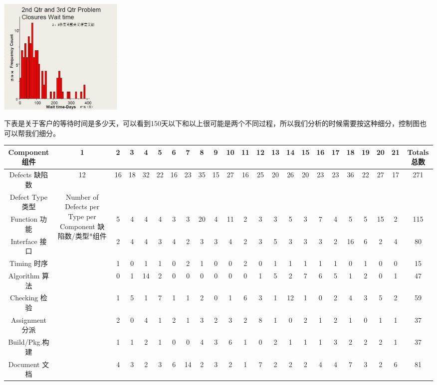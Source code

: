 
\includegraphics[width=6cm]{微信截图_20231026160044.png}

下表是关于客户的等待时间是多少天，可以看到150天以下和以上很可能是两个不同过程，所以我们分析的时候需要按这种细分，控制图也可以帮我们细分。



\begin{tabular}{|c|c|c|c|c|c|c|c|c|c|c|c|c|c|c|c|c|c|c|c|c|c|c|}
\hline
Component 组件&1&2&3&4&5&6&7&8&9&10&11&12&13&14&15&16&17&18&19&20&21&Totals 总数\\
\hline
Defects 缺陷数&12&16&18&32&22&16&23&35&15&27&16&25&20&26&20&23&23&36&22&27&17&271\\
\hline
Defect Type 类型&\multirow{21}{*}{Number of Defects per Type per Component 缺陷数/类型*组件}&\:\\
\hline
Function 功能&3&5&4&4&4&3&3&20&4&11&2&3&3&5&3&7&4&5&5&15&2&115\\
\hline
Interface 接口&2&2&4&4&3&4&2&3&3&4&2&3&5&3&3&3&2&16&6&2&4&80\\
\hline
Timing 时序&1&1&0&1&1&0&2&1&0&0&2&0&1&1&1&1&1&0&1&0&0&15\\
\hline
Algorithm 算法&0&0&1&14&2&0&0&0&0&0&0&1&5&2&7&6&5&1&2&0&1&47\\
\hline
Checking 检验&1&1&5&1&7&1&1&2&0&1&6&3&1&12&1&0&2&4&3&5&2&59\\
\hline
Assignment 分派&0&2&0&4&1&2&1&3&2&3&2&8&1&0&2&1&2&1&0&1&1&37\\
\hline
Build/Pkg.构建&3&1&1&2&1&0&0&4&3&6&1&0&2&1&1&1&3&2&2&2&1&37\\
\hline
Document 文档&2&4&3&2&3&6&14&2&3&2&1&7&2&2&2&4&4&7&3&2&6&81\\
\hline
\end{tabular}


